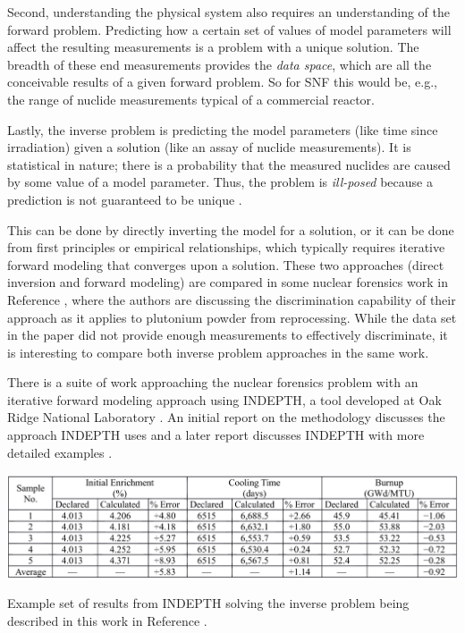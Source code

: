 Second, understanding the physical system also requires an understanding of the
forward problem. Predicting how a certain set of values of model parameters
will affect the resulting measurements is a problem with a unique solution.
The breadth of these end measurements provides the \textit{data space}, which
are all the conceivable results of a given forward problem. So for \gls{SNF}
this would be, e.g., the range of nuclide measurements typical of a commercial
reactor. 

Lastly, the inverse problem is predicting the model parameters (like time since
irradiation) given a solution (like an assay of nuclide measurements).  It is
statistical in nature; there is a probability that the measured nuclides are
caused by some value of a model parameter. Thus, the problem is
\textit{ill-posed} because a prediction is not guaranteed to be unique
\cite{skutnik_2016}. 

This can be done by directly inverting the model for a solution, or it can be
done from first principles or empirical relationships, which typically requires
iterative forward modeling that converges upon a solution. These two approaches
(direct inversion and forward modeling) are compared in some nuclear forensics
work in Reference \cite{inverse_compare},  where the authors are discussing the
discrimination capability of their approach as it applies to plutonium powder
from reprocessing. While the data set in the paper did not provide enough
measurements to effectively discriminate, it is interesting to compare both
inverse problem approaches in the same work.  

There is a suite of work approaching the nuclear forensics problem with an
iterative forward modeling approach using \gls{INDEPTH}, a tool developed at
Oak Ridge National Laboratory \cite{grogan_sensitivity1, grogan_sensitivity2,
grogan_indepth_2018, weber_2006, weber_2010, weber_2011}.  An initial report on
the methodology discusses the approach \gls{INDEPTH} uses \cite{weber_2006} and
a later report discusses \gls{INDEPTH} with more detailed examples
\cite{grogan_indepth_2018}.  

\begin{table}[!htb]
  \centering
  \includegraphics[width=\linewidth]{./chapters/litrev/indepth.png}
  \caption[Example of results from \acrshort{INDEPTH}]
          {Example set of results from \acrshort{INDEPTH} solving the inverse 
           problem being described in this work in Reference 
           \cite{grogan_indepth_2018}.}
  \label{tbl:indepth}
\end{table}

